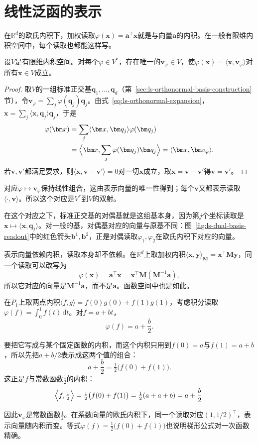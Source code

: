 
\section{线性泛函的表示}
\label{sec:ls-riesz-representation}
在$\mathbb R^d$的欧氏内积下，加权读取$\varphi(\bm x)=\bm a^\top\bm x$就是与向量$\bm a$的内积。在一般有限维内积空间中，每个读取也都能这样写。
\begin{theorem}[有限维Riesz表示定理]
\label{thm:ls-riesz-representation}
设$V$是有限维内积空间。对每个$\varphi\in V^*$，存在唯一的$\bm v_\varphi\in V$，使$\varphi(\bm x)=\langle\bm x,\bm v_\varphi\rangle$对所有$\bm x\in V$成立。
\end{theorem}
\begin{proof}
取$V$的一组标准正交基$\bm q_1,\ldots,\bm q_d$（第~\ref{sec:ls-orthonormal-basis-construction}节），令$\bm v_\varphi=\sum_j\varphi(\bm q_j)\bm q_j$。由式~\eqref{eq:ls-orthonormal-expansion}，$\bm x=\sum_j\langle\bm x,\bm q_j\rangle\bm q_j$，于是
\[
 \begin{aligned}
 \varphi(\bm x)&=\sum_j\langle\bm x,\bm q_j\rangle\varphi(\bm q_j)\\
 &=\Bigl\langle\bm x,\sum_j\varphi(\bm q_j)\bm q_j\Bigr\rangle=\langle\bm x,\bm v_\varphi\rangle.
 \end{aligned}
\]
若$\bm v,\bm v'$都满足要求，则$\langle\bm x,\bm v-\bm v'\rangle=0$对一切$\bm x$成立，取$\bm x=\bm v-\bm v'$得$\bm v=\bm v'$。
\end{proof}
对应$\varphi\mapsto\bm v_\varphi$保持线性组合，这由表示向量的唯一性得到；每个$\bm v$又都表示读取$\langle\cdot,\bm v\rangle$。所以这个对应是$V^*$到$V$的双射。

在这个对应之下，标准正交基的对偶基就是这组基本身，因为第$j$个坐标读取是$\bm x\mapsto\langle\bm x,\bm q_j\rangle$。对一般的基，对偶基对应的向量与原基不同：图~\ref{fig:ls-dual-basis-readout}中的红色箭头$\bm b^1,\bm b^2$，正是对偶读取$\varphi_1,\varphi_2$在欧氏内积下对应的向量。

表示向量依赖内积，读取本身却不依赖。在$\mathbb R^d$上取加权内积$\langle\bm x,\bm y\rangle_{\bm M}=\bm x^\top\bm M\bm y$，同一个读取可以改写为
\[
 \varphi(\bm x)=\bm a^\top\bm x=\bm x^\top\bm M(\bm M^{-1}\bm a),
\]
所以它对应的向量是$\bm M^{-1}\bm a$，而不是$\bm a$。函数空间中也是如此。
\begin{example}[积分读取在两点内积下的表示向量]
\label{ex:ls-riesz-integral-two-point}
在$P_1$上取两点内积$\langle f,g\rangle=f(0)g(0)+f(1)g(1)$，考虑积分读取$\varphi(f)=\int_0^1f(t)\,\mathrm dt$。对$f=a+bt$，
\[
 \varphi(f)=a+\frac b2 .
\]

要把它写成与某个固定函数的内积，而这个内积只用到$f(0)=a$与$f(1)=a+b$，所以先把$a+b/2$表示成这两个值的组合：
\[
 a+\frac b2=\tfrac12\bigl(f(0)+f(1)\bigr).
\]
这正是$f$与常数函数$\tfrac12$的内积：
\[
 \Bigl\langle f,\tfrac12\Bigr\rangle=\tfrac12\bigl(f(0)+f(1)\bigr)=\tfrac12(a+a+b)=a+\frac b2 .
\]

因此$\bm v_\varphi$是常数函数$\tfrac12$。在系数向量的欧氏内积下，同一个读取对应$(1,1/2)^\top$，表示向量随内积而变。等式$\varphi(f)=\tfrac12\bigl(f(0)+f(1)\bigr)$也说明梯形公式对一次函数精确。
\end{example}

